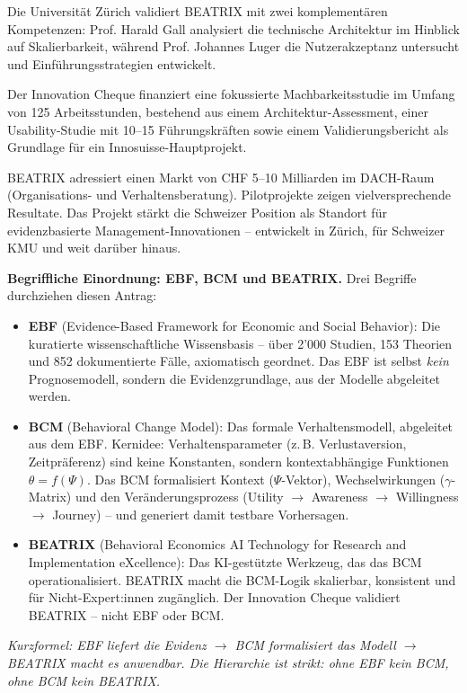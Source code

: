 \documentclass[11pt,a4paper]{article}
\begin{document}
Die Universität Zürich validiert BEATRIX mit zwei komplementären Kompetenzen: Prof. Harald Gall analysiert die technische Architektur im Hinblick auf Skalierbarkeit, während Prof. Johannes Luger die Nutzerakzeptanz untersucht und Einführungsstrategien entwickelt.

Der Innovation Cheque finanziert eine fokussierte Machbarkeitsstudie im Umfang von 125 Arbeitsstunden, bestehend aus einem Architektur-Assessment, einer Usability-Studie mit 10--15 Führungskräften sowie einem Validierungsbericht als Grundlage für ein Innosuisse-Hauptprojekt.

BEATRIX adressiert einen Markt von CHF 5--10 Milliarden im DACH-Raum (Organisations- und Verhaltensberatung). Pilotprojekte zeigen vielversprechende Resultate. Das Projekt stärkt die Schweizer Position als Standort für evidenzbasierte Management-Innovationen -- entwickelt in Zürich, für Schweizer KMU und weit darüber hinaus.

\vspace{0.5cm}
\noindent\textbf{Begriffliche Einordnung: EBF, BCM und BEATRIX.} Drei Begriffe durchziehen diesen Antrag:

\begin{itemize}[nosep]
    \item \textbf{EBF} (Evidence-Based Framework for Economic and Social Behavior): Die kuratierte wissenschaftliche Wissensbasis -- über 2'000 Studien, 153 Theorien und 852 dokumentierte Fälle, axiomatisch geordnet. Das EBF ist selbst \emph{kein} Prognosemodell, sondern die Evidenzgrundlage, aus der Modelle abgeleitet werden.
    \item \textbf{BCM} (Behavioral Change Model): Das formale Verhaltensmodell, abgeleitet aus dem EBF. Kernidee: Verhaltensparameter (z.\,B. Verlustaversion, Zeitpräferenz) sind keine Konstanten, sondern kontextabhängige Funktionen $\theta = f(\Psi)$. Das BCM formalisiert Kontext ($\Psi$-Vektor), Wechselwirkungen ($\gamma$-Matrix) und den Veränderungsprozess (Utility $\to$ Awareness $\to$ Willingness $\to$ Journey) -- und generiert damit testbare Vorhersagen.
    \item \textbf{BEATRIX} (Behavioral Economics AI Technology for Research and Implementation eXcellence): Das KI-gestützte Werkzeug, das das BCM operationalisiert. BEATRIX macht die BCM-Logik skalierbar, konsistent und für Nicht-Expert:innen zugänglich. Der Innovation Cheque validiert BEATRIX -- nicht EBF oder BCM.
\end{itemize}

\noindent\textit{Kurzformel: EBF liefert die Evidenz $\to$ BCM formalisiert das Modell $\to$ BEATRIX macht es anwendbar. Die Hierarchie ist strikt: ohne EBF kein BCM, ohne BCM kein BEATRIX.}
\end{document}
